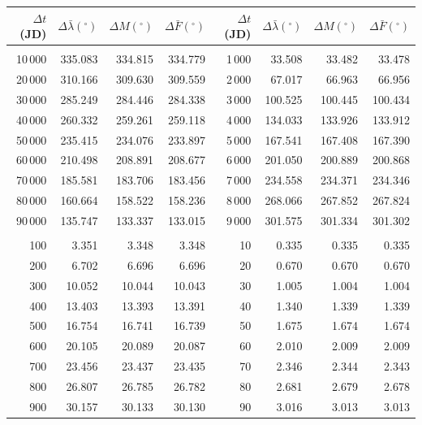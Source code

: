 \clearpage
\begin{table}[!h]
\vspace{0.25cm}
\centering
\begin{tabular}{rrrr|rrrr}
$\Delta t$(JD)& $\Delta\bar{\lambda}(^\circ)$ &  $\Delta M(^\circ)$ & $\Delta \bar{F}(^\circ)$& $\Delta t$(JD) & $\Delta\bar{\lambda}(^\circ)$ & $\Delta M(^\circ)$ 
&$\Delta \bar{F}(^\circ)$\\ \hline
&&&&&&&\\[-1.75ex]
10\,000 & 335.083 & 334.815 & 334.779 & 1\,000 &  33.508 &  33.482 &  33.478\\
20\,000 & 310.166 & 309.630 & 309.559 & 2\,000 &  67.017 &  66.963 &  66.956\\
30\,000 & 285.249 & 284.446 & 284.338 & 3\,000 & 100.525 & 100.445 & 100.434\\
40\,000 & 260.332 & 259.261 & 259.118 & 4\,000 & 134.033 & 133.926 & 133.912\\
50\,000 & 235.415 & 234.076 & 233.897 & 5\,000 & 167.541 & 167.408 & 167.390\\
60\,000 & 210.498 & 208.891 & 208.677 & 6\,000 & 201.050 & 200.889 & 200.868\\
70\,000 & 185.581 & 183.706 & 183.456 & 7\,000 & 234.558 & 234.371 & 234.346\\
80\,000 & 160.664 & 158.522 & 158.236 & 8\,000 & 268.066 & 267.852 & 267.824\\
90\,000 & 135.747 & 133.337 & 133.015 & 9\,000 & 301.575 & 301.334 & 301.302\\
&&&&&&&\\
100 &   3.351 &   3.348 &   3.348 & 10 &   0.335 &   0.335 &   0.335\\
200 &   6.702 &   6.696 &   6.696 & 20 &   0.670 &   0.670 &   0.670\\
300 &  10.052 &  10.044 &  10.043 & 30 &   1.005 &   1.004 &   1.004\\
400 &  13.403 &  13.393 &  13.391 & 40 &   1.340 &   1.339 &   1.339\\
500 &  16.754 &  16.741 &  16.739 & 50 &   1.675 &   1.674 &   1.674\\
600 &  20.105 &  20.089 &  20.087 & 60 &   2.010 &   2.009 &   2.009\\
700 &  23.456 &  23.437 &  23.435 & 70 &   2.346 &   2.344 &   2.343\\
800 &  26.807 &  26.785 &  26.782 & 80 &   2.681 &   2.679 &   2.678\\
900 &  30.157 &  30.133 &  30.130 & 90 &   3.016 &   3.013 &   3.013\\

\end{tabular}
\end{table}
